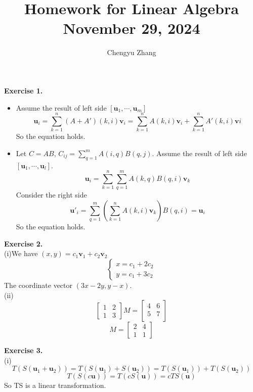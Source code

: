 \documentclass{article}
\title{\vspace*{-3.5cm}Homework for Linear Algebra \\November 29, 2024}
\author{Chengyu Zhang}
\date{}
\begin{document}
\maketitle

\textbf{Exercise 1.}\\
\begin{itemize}
    \item Assume the result of left side $[\mathbf{u}_1,\cdots , \mathbf{u}_m]$\[
    \mathbf{u}_i=\sum_{k=1}^{n}(A+A')(k,i)\mathbf{v}_i=\sum_{k=1}^{n}A(k,i)\mathbf{v}_i+\sum_{k=1}^{n}A'(k,i)\mathbf{v}{i}
    \]
    So the equation holds.\\
    \item Let $C=AB$, $C_{ij}=\sum_{q=1}^{m}A(i,q)B(q,j)$. Assume the result of left side $[\mathbf{u}_1,\cdots , \mathbf{u}_l]$.
    \[
    \mathbf{u}_i=\sum_{k=1}^{n}\sum_{q=1}^{m}A(k,q)B(q,i)\mathbf{v}_k
    \]
    Consider the right side \[
    \mathbf{u}'_i=\sum_{q=1}^{m}(\sum_{k=1}^{n}A(k,i)\mathbf{v}_k)B(q,i)=\mathbf{u}_i
    \]
    So the equation holds.
\end{itemize}

\textbf{Exercise 2.}\\
(i)We have $(x,y)=c_1\mathbf{v}_1+c_2\mathbf{v}_2$
\[
\left\{
    \begin{array}{ll}
        x=c_1+2c_2\\
        y=c_1+3c_2
    \end{array}
\right.
\]
The coordinate vector $(3x-2y,y-x)$.\\

(ii)\[
\begin{bmatrix}
    1 & 2 \\
    1 & 3
\end{bmatrix}M=\begin{bmatrix}
    4 & 6 \\
    5 & 7 \\
\end{bmatrix}
\]
\[
M=\begin{bmatrix}
    2 & 4 \\
    1 & 1
\end{bmatrix}
\]

\textbf{Exercise 3.}\\
(i)\[
T(S(\mathbf{u}_1+\mathbf{u}_2))=T(S(\mathbf{u}_1)+S(\mathbf{u}_2))=T(S(\mathbf{u}_1))+T(S(\mathbf{u}_2))
\]
\[
T(S(c\mathbf{u}))=T(cS(\mathbf{u}))=cTS(\mathbf{u})
\]
So TS is a linear transformation.\\
\end{document}
